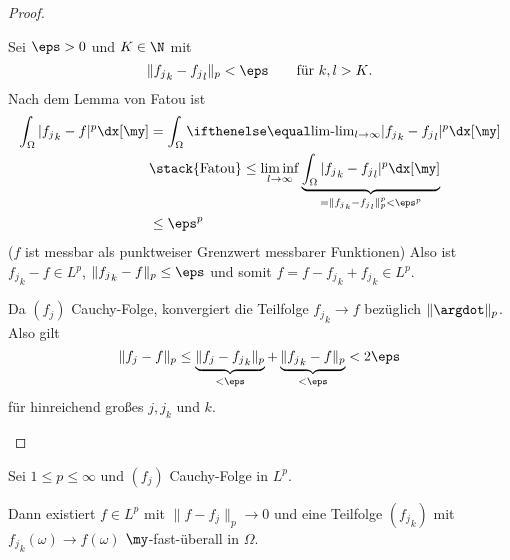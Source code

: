 \begin{st}
\begin{proof}
\begin{seg}[$1 \le p < \infty$]
\begin{enumerate}[a)]
					Sei $\eps > 0$ und $K \in \N$ mit
					\[
						\|{f_j}_k - {f_j}_l \|_p < \eps  \qquad \text{für $k,l > K$.}
					\]
					Nach dem Lemma von Fatou ist
					\begin{align*}
						\int_{\Omega} |{f_j}_k - f|^p \dx[\my]
						&= \int_{\Omega} \lim_{l\to \infty} |{f_j}_k - {f_j}_l |^p \dx[\my] \\
						&\stack{\text{Fatou}}\le \liminf_{l\to \infty} \underbrace{\int_{\Omega} |{f_j}_k - {f_j}_l |^p \dx[\my]}_{= \|{f_j}_k - {f_j}_l\|_p^p < \eps^p} \\
						&\le \eps^p
					\end{align*}
					($f$ ist messbar als punktweiser Grenzwert messbarer Funktionen)
					Also ist ${f_j}_k - f \in L^p$, $\|{f_j}_k - f\|_p \le \eps$ und somit $f = f - {f_j}_k + {f_j}_k \in L^p$.

					Da $(f_j)$ Cauchy-Folge, konvergiert die Teilfolge ${f_j}_k \to f$ bezüglich $\|\argdot\|_p$.
					Also gilt
					\[
						\|f_j - f\|_p 
						\le \underbrace{\|f_j - {f_j}_k \|_p}_{< \eps} + \underbrace{\|{f_j}_k - f\|_p}_{< \eps}
						< 2 \eps
					\]
					für hinreichend großes $j, j_k$ und $k$.
			\end{enumerate}
		\end{seg}
	\end{proof}
\end{st}
\setcounter{thm}{13}
\begin{kor}[Weyl] \label{2.14}
	Sei $1 \le p \le \infty$ und $(f_j)$ Cauchy-Folge in $L^p$.
	
	Dann existiert $f \in L^p$ mit $\|f - f_j\|_p \to 0$ und eine Teilfolge $({f_j}_k)$ mit ${f_j}_k(\omega) \to f(\omega)$ $\my$-fast-überall in $\Omega$.
\end{kor}

